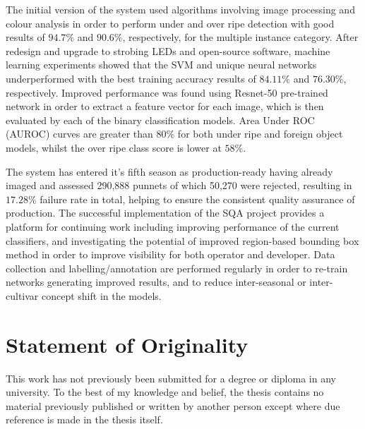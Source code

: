 \documentclass[fleqn,twoside,12pt]{report}
\begin{document}
The initial version of the system used algorithms involving image processing and colour analysis in order to perform under and over ripe detection with good results of $94.7\%$ and $90.6\%$, respectively, for the multiple instance category. After redesign and upgrade to strobing LEDs and open-source software, machine learning experiments showed that the SVM and unique neural networks underperformed with the best training accuracy results of $84.11\%$ and $76.30\%$, respectively. Improved performance was found using Resnet-50 pre-trained network in order to extract a feature vector for each image, which is then evaluated by each of the binary classification models. Area Under ROC (AUROC) curves are greater than $80\%$ for both under ripe and foreign object models, whilst the over ripe class score is lower at $58\%$. 

The system has entered it's fifth season as production-ready having already imaged and assessed 290,888 punnets of which 50,270 were rejected, resulting in $17.28\%$ failure rate in total, helping to ensure the consistent quality assurance of production. The successful implementation of the SQA project provides a platform for continuing work including improving performance of the current classifiers, and investigating the potential of improved region-based bounding box method in order to improve visibility for both operator and developer. Data collection and labelling/annotation are performed regularly in order to re-train networks generating improved results, and to reduce inter-seasonal or inter-cultivar concept shift in the models. 





\vspace*{\fill}%




\newpage

\chapter*{Statement of Originality}

This work has not previously been submitted for a degree or diploma in any university. To the best of my knowledge and belief, the thesis contains no material previously published or written by another person except where due reference is made in the thesis itself.
\end{document}
